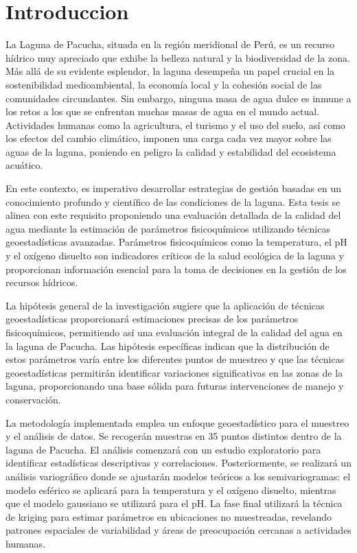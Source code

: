 \newpage
\section*{Introduccion}
 
La Laguna de Pacucha, situada en la región meridional de Perú, es un recurso hídrico muy apreciado que exhibe la belleza natural y la biodiversidad de la zona. Más allá de su evidente esplendor, la laguna desempeña un papel crucial en la sostenibilidad medioambiental, la economía local y la cohesión social de las comunidades circundantes. Sin embargo, ninguna masa de agua dulce es inmune a los retos a los que se enfrentan muchas masas de agua en el mundo actual. Actividades humanas como la agricultura, el turismo y el uso del suelo, así como los efectos del cambio climático, imponen una carga cada vez mayor sobre las aguas de la laguna, poniendo en peligro la calidad y estabilidad del ecosistema acuático.

En este contexto, es imperativo desarrollar estrategias de gestión basadas en un conocimiento profundo y científico de las condiciones de la laguna. Esta tesis se alinea con este requisito proponiendo una evaluación detallada de la calidad del agua mediante la estimación de parámetros fisicoquímicos utilizando técnicas geoestadísticas avanzadas. Parámetros fisicoquímicos como la temperatura, el pH y el oxígeno disuelto son indicadores críticos de la salud ecológica de la laguna y proporcionan información esencial para la toma de decisiones en la gestión de los recursos hídricos.

La hipótesis general de la investigación sugiere que la aplicación de técnicas geoestadísticas proporcionará estimaciones precisas de los parámetros fisicoquímicos, permitiendo así una evaluación integral de la calidad del agua en la laguna de Pacucha. Las hipótesis específicas indican que la distribución de estos parámetros varía entre los diferentes puntos de muestreo y que las técnicas geoestadísticas permitirán identificar variaciones significativas en las zonas de la laguna, proporcionando una base sólida para futuras intervenciones de manejo y conservación.

La metodología implementada emplea un enfoque geoestadístico para el muestreo y el análisis de datos. Se recogerán muestras en 35 puntos distintos dentro de la laguna de Pacucha. El análisis comenzará con un estudio exploratorio para identificar estadísticas descriptivas y correlaciones. Posteriormente, se realizará un análisis variográfico donde se ajustarán modelos teóricos a los semivariogramas: el modelo esférico se aplicará para la temperatura y el oxígeno disuelto, mientras que el modelo gaussiano se utilizará para el pH. La fase final utilizará la técnica de kriging para estimar parámetros en ubicaciones no muestreadas, revelando patrones espaciales de variabilidad y áreas de preocupación cercanas a actividades humanas.

